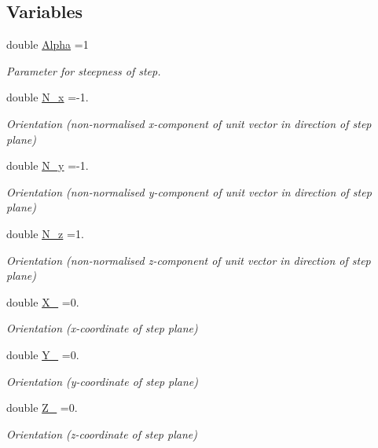 \subsection*{Variables}
\begin{DoxyCompactItemize}
\item 
double \hyperlink{namespaceTanhSolnForPoisson_ae676ccd186d5df119cce811596d949c1}{Alpha} =1
\begin{DoxyCompactList}\small\item\em Parameter for steepness of step. \end{DoxyCompactList}\item 
double \hyperlink{namespaceTanhSolnForPoisson_ac3d25f0791c1363f487600e02757bc97}{N\+\_\+x} =-\/1.
\begin{DoxyCompactList}\small\item\em Orientation (non-\/normalised x-\/component of unit vector in direction of step plane) \end{DoxyCompactList}\item 
double \hyperlink{namespaceTanhSolnForPoisson_a482d668ef91071985d1f4ce7cf29a926}{N\+\_\+y} =-\/1.
\begin{DoxyCompactList}\small\item\em Orientation (non-\/normalised y-\/component of unit vector in direction of step plane) \end{DoxyCompactList}\item 
double \hyperlink{namespaceTanhSolnForPoisson_ae6b5b5d21747a45776004756dc97dc5c}{N\+\_\+z} =1.
\begin{DoxyCompactList}\small\item\em Orientation (non-\/normalised z-\/component of unit vector in direction of step plane) \end{DoxyCompactList}\item 
double \hyperlink{namespaceTanhSolnForPoisson_af55e0479c15ab58929eb96ee9d6cf07a}{X\+\_} =0.
\begin{DoxyCompactList}\small\item\em Orientation (x-\/coordinate of step plane) \end{DoxyCompactList}\item 
double \hyperlink{namespaceTanhSolnForPoisson_addc6dc6578b16a1d9aa774c25776b921}{Y\+\_} =0.
\begin{DoxyCompactList}\small\item\em Orientation (y-\/coordinate of step plane) \end{DoxyCompactList}\item 
double \hyperlink{namespaceTanhSolnForPoisson_abf4856ed1855c34c2b2ea57fd6783644}{Z\+\_} =0.
\begin{DoxyCompactList}\small\item\em Orientation (z-\/coordinate of step plane) \end{DoxyCompactList}\end{DoxyCompactItemize}


